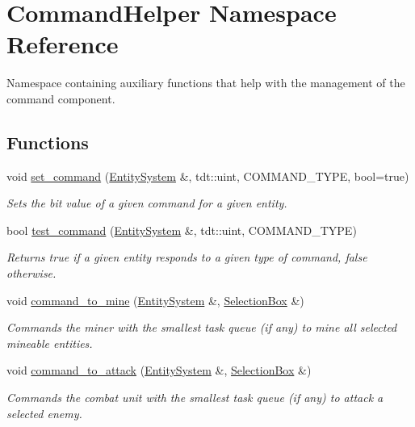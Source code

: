\hypertarget{namespace_command_helper}{}\section{Command\+Helper Namespace Reference}
\label{namespace_command_helper}


Namespace containing auxiliary functions that help with the management of the command component.  


\subsection*{Functions}
\begin{DoxyCompactItemize}
\item 
void \hyperlink{namespace_command_helper_abe36e978e6486d3588bbbd0bd287f68d}{set\+\_\+command} (\hyperlink{class_entity_system}{Entity\+System} \&, tdt\+::uint, C\+O\+M\+M\+A\+N\+D\+\_\+\+T\+Y\+PE, bool=true)
\begin{DoxyCompactList}\small\item\em Sets the bit value of a given command for a given entity. \end{DoxyCompactList}\item 
bool \hyperlink{namespace_command_helper_a3e1042d44c635da9c7e5b7908d14429e}{test\+\_\+command} (\hyperlink{class_entity_system}{Entity\+System} \&, tdt\+::uint, C\+O\+M\+M\+A\+N\+D\+\_\+\+T\+Y\+PE)
\begin{DoxyCompactList}\small\item\em Returns true if a given entity responds to a given type of command, false otherwise. \end{DoxyCompactList}\item 
void \hyperlink{namespace_command_helper_ad9e19d35cf3ec9d8b823aab49ca98676}{command\+\_\+to\+\_\+mine} (\hyperlink{class_entity_system}{Entity\+System} \&, \hyperlink{class_selection_box}{Selection\+Box} \&)
\begin{DoxyCompactList}\small\item\em Commands the miner with the smallest task queue (if any) to mine all selected mineable entities. \end{DoxyCompactList}\item 
void \hyperlink{namespace_command_helper_a987de42c40cca051fc6c66521cc1a2b7}{command\+\_\+to\+\_\+attack} (\hyperlink{class_entity_system}{Entity\+System} \&, \hyperlink{class_selection_box}{Selection\+Box} \&)
\begin{DoxyCompactList}\small\item\em Commands the combat unit with the smallest task queue (if any) to attack a selected enemy. \end{DoxyCompactList}\item 

\end{DoxyCompactItemize}

